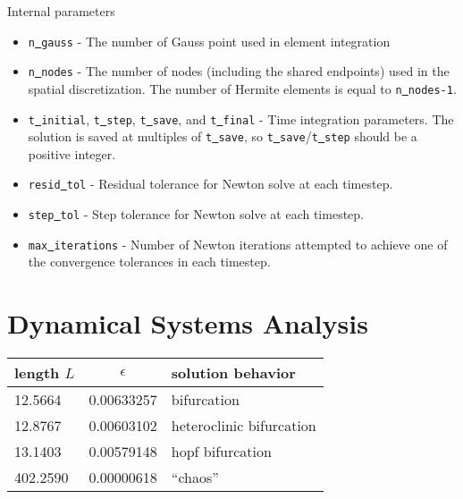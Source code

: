 \documentclass[11pt]{article}
\begin{document}
Internal parameters
%
\begin{itemize}
  \item {\tt n\underline{ }gauss} - \newline
  The number of Gauss point used in element integration
  \item {\tt n\underline{ }nodes} - \newline
  The number of nodes (including the shared endpoints) used in the 
  spatial discretization.  The number of Hermite elements is equal to
  {\tt n\underline{ }nodes-1}.
  \item {\tt t\underline{ }initial}, {\tt t\underline{ }step}, 
  {\tt t\underline{ }save}, and {\tt t\underline{ }final} - \newline
  Time integration parameters.  The solution is saved at multiples of
  {\tt t\underline{ }save}, so {\tt t\underline{ }save}/{\tt t\underline{ }step}
  should be a positive integer.
  \item {\tt resid\underline{ }tol} - \newline
  Residual tolerance for Newton solve at each timestep.
  \item {\tt step\underline{ }tol} - \newline
  Step tolerance for Newton solve at each timestep.
  \item {\tt max\underline{ }iterations} - \newline
  Number of Newton iterations attempted to achieve one of the convergence
  tolerances in each timestep.
\end{itemize}

\section*{Dynamical Systems Analysis}

\begin{table}
\begin{center}
\begin{tabular}{lll}
\hline
length $L$ & \multicolumn{1}{c}{$\epsilon$} & solution behavior \\
\hline
12.5664  &  0.00633257  & bifurcation \\
12.8767  &  0.00603102  & heteroclinic bifurcation \\
13.1403  &  0.00579148  & hopf bifurcation \\
402.2590 &  0.00000618  & ``chaos'' \\
\hline
\end{tabular}
\end{center}
\end{table}
\end{document}
